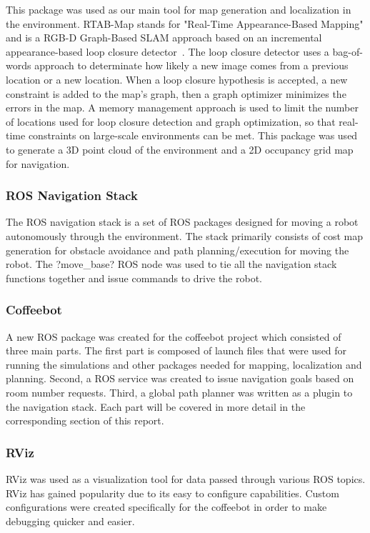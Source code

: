 \documentclass[letterpaper, 10 pt, conference]{ieeeconf}  %
\begin{document}
This package was used as our main tool for map generation and localization in the environment. RTAB-Map stands for "Real-Time Appearance-Based Mapping" and is a RGB-D Graph-Based SLAM approach based on an incremental appearance-based loop closure detector~\cite{rtabmap2014}. The loop closure detector uses a bag-of-words approach to determinate how likely a new image comes from a previous location or a new location. When a loop closure hypothesis is accepted, a new constraint is added to the map's graph, then a graph optimizer minimizes the errors in the map. A memory management approach is used to limit the number of locations used for loop closure detection and graph optimization, so that real-time constraints on large-scale environments can be met. This package was used to generate a 3D point cloud of the environment and a 2D occupancy grid map for navigation.

\subsubsection{ROS Navigation Stack}

The ROS navigation stack is a set of ROS packages designed for moving a robot autonomously through the environment. The stack primarily consists of cost map generation for obstacle avoidance and path planning/execution for moving the robot. The ?move\_base? ROS node was used to tie all the navigation stack functions together and issue commands to drive the robot. 

\subsubsection{Coffeebot}

A new ROS package was created for the coffeebot project which consisted of three main parts. The first part is composed of launch files that were used for running the simulations and other packages needed for mapping, localization and planning. Second, a ROS service was created to issue navigation goals based on room number requests. Third, a global path planner was written as a plugin to the navigation stack. Each part will be covered in more detail in the corresponding section of this report. 

\subsubsection{RViz}

RViz was used as a visualization tool for data passed through various ROS topics. RViz has gained popularity due to its easy to configure capabilities. Custom configurations were created specifically for the coffeebot in order to make debugging quicker and easier. 
\end{document}
